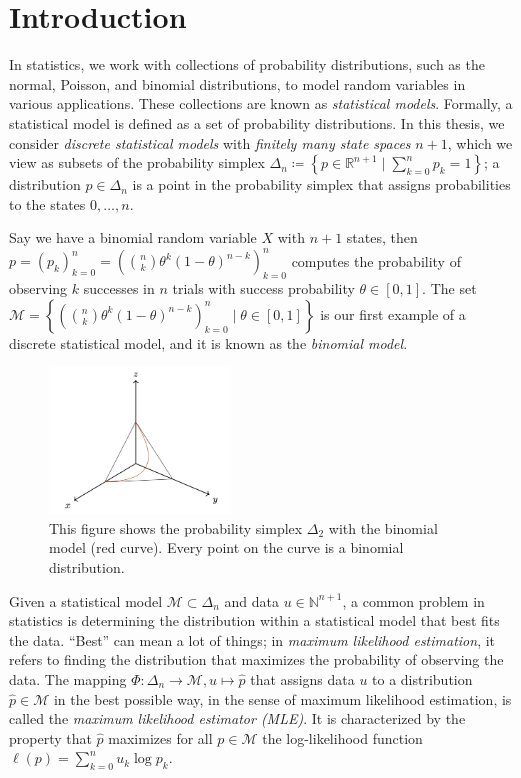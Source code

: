 \chapter{Introduction} 

In statistics, we work with collections of probability distributions, such as the normal, Poisson, and binomial distributions, to model random variables in various applications. These collections are known as \emph{statistical models}. Formally, a statistical model is defined as a set of probability distributions. In this thesis, we consider \emph{discrete statistical models} with \emph{finitely many state spaces} \( n + 1 \), which we view as subsets of the probability simplex \( \Delta_n \coloneqq \left\{ p \in \mathbb{R}^{n + 1} \mid \sum_{k=0}^n p_k = 1 \right\} \); a distribution \( p \in \Delta_n \) is a point in the probability simplex that assigns probabilities to the states \( 0, \dots, n \).
 
\begin{example}
Say we have a binomial random variable \( X \) with \( n + 1 \) states, then \( p = (p_k)_{k=0}^n = (\binom{n}{k} \theta^k (1-\theta)^{n-k})_{k=0}^n \) computes the probability of observing \( k \) successes in \( n \) trials with success probability \( \theta \in [0,1] \). The set \( \mathcal{M} = \left\{ (\binom{n}{k} \theta^k (1-\theta)^{n-k})_{k=0}^n \mid \theta \in [0,1] \right\} \) is our first example of a discrete statistical model, and it is known as the \emph{binomial model}.

\begin{figure}[H]
    \centering
    \includegraphics[width=0.43\textwidth]{assets/binom-discrete-model.png}
    \caption{This figure shows the probability simplex \( \Delta_2 \) with the binomial model (red curve). Every point on the curve is a binomial distribution.}
    \label{fig:binom-discrete-model}
\end{figure}
\end{example}

Given a statistical model \( \mathcal{M} \subset \Delta_n \) and data \( u \in \mathbb{N}^{n+1} \), a common problem in statistics is determining the distribution within a statistical model that best fits the data. ``Best'' can mean a lot of things; in \emph{maximum likelihood estimation}, it refers to finding the distribution that maximizes the probability of observing the data. The mapping \( \Phi: \Delta_n \to \mathcal{M}, u \mapsto \hat{p}\)
that assigns data \( u \) to a distribution \( \hat{p} \in \mathcal{M} \) in the best possible way, in the sense of maximum likelihood estimation, is called the \emph{maximum likelihood estimator (MLE)}. It is characterized by the property that \( \hat{p} \) maximizes for all \( p \in \mathcal{M} \) the log-likelihood function \( \ell(p) = \sum_{k=0}^n u_k \log p_k \).

